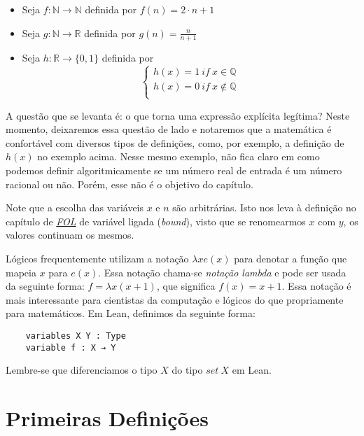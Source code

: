 \begin{itemize}
    \item Seja $f: \mathbb{N} \to \mathbb{N}$ definida por 
    $f(n) = 2\cdot n + 1$
    \item Seja $g : \mathbb{N} \to \mathbb{R}$ definida por 
    $g(n) = \frac{n}{n+1}$
    \item Seja $h : \mathbb{R} \to \{0,1\}$ definida por 
    $$\left \{ \begin{array}{c}
    h(x) = 1 ~if~x \in \mathbb{Q} \\
    h(x) = 0 ~ if ~ x \not \in \mathbb{Q} \\
    \end{array}
    \right. $$
 \end{itemize}

A questão que se levanta é: o que torna uma expressão explícita legítima? 
Neste momento, deixaremos essa questão de lado e notaremos que a matemática 
é confortável com diversos tipos de definições, como, por exemplo, a definição 
de $h(x)$ no exemplo acima. Nesse mesmo exemplo, não fica claro em como podemos 
definir algoritmicamente se um número real de entrada é um número racional ou não.
Porém, esse não é o objetivo do capítulo.

Note que a escolha das variáveis $x$ e $n$ são arbitrárias. 
Isto nos leva à definição no capítulo de \textit{\hyperlink{chapter.4}{FOL}} de 
variável ligada (\textit{bound}), visto que se renomearmos $x$ com $y$, os valores
continuam os mesmos. 

Lógicos frequentemente utilizam a notação $\lambda x e(x)$ para denotar a função
que mapeia $x$ para $e(x)$. Essa notação chama-se \textit{notação lambda} e pode 
ser usada da seguinte forma: $f = \lambda x(x + 1)$, que significa $f(x) = x + 1$. 
Essa notação é mais interessante para cientistas da computação e lógicos do que 
propriamente para matemáticos. Em Lean, definimos da seguinte forma: 

\begin{lstlisting}
    variables X Y : Type
    variable f : X → Y    
\end{lstlisting}

Lembre-se que diferenciamos o tipo $X$ do tipo $set~X$ em Lean.

\section{Primeiras Definições}

\theoremstyle{definition}
\newtheorem{definition}{Definição}[section]


